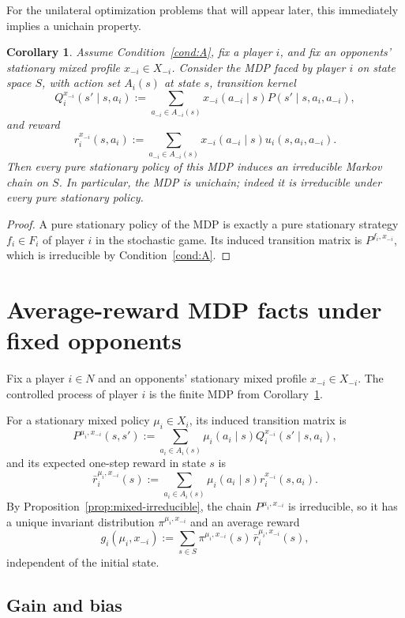 \documentclass[11pt]{article}
\newtheorem{corollary}[theorem]{Corollary}
\theoremstyle{definition}
\newcommand{\1}{\mathbf{1}}
\begin{document}
For the unilateral optimization problems that will appear later, this immediately implies a unichain property.

\begin{corollary}\label{cor:unichain-from-A}
Assume Condition~\ref{cond:A}, fix a player $i$, and fix an opponents' stationary mixed profile $x_{-i}\in X_{-i}$. Consider the MDP faced by player $i$ on state space $S$, with action set $A_i(s)$ at state $s$, transition kernel
\[
Q_i^{x_{-i}}(s'\mid s,a_i):=\sum_{a_{-i}\in A_{-i}(s)}x_{-i}(a_{-i}\mid s)P(s'\mid s,a_i,a_{-i}),
\]
and reward
\[
r_i^{x_{-i}}(s,a_i):=\sum_{a_{-i}\in A_{-i}(s)}x_{-i}(a_{-i}\mid s)u_i(s,a_i,a_{-i}).
\]
Then every pure stationary policy of this MDP induces an irreducible Markov chain on $S$. In particular, the MDP is unichain; indeed it is irreducible under every pure stationary policy.
\end{corollary}

\begin{proof}
A pure stationary policy of the MDP is exactly a pure stationary strategy $f_i\in F_i$ of player $i$ in the stochastic game. Its induced transition matrix is $P^{f_i,x_{-i}}$, which is irreducible by Condition~\ref{cond:A}.
\end{proof}

\section{Average-reward MDP facts under fixed opponents}\label{sec:mdp}

Fix a player $i\in N$ and an opponents' stationary mixed profile $x_{-i}\in X_{-i}$. The controlled process of player $i$ is the finite MDP from Corollary~\ref{cor:unichain-from-A}.

For a stationary mixed policy $\mu_i\in X_i$, its induced transition matrix is
\[
P^{\mu_i,x_{-i}}(s,s'):=\sum_{a_i\in A_i(s)}\mu_i(a_i\mid s)
Q_i^{x_{-i}}(s'\mid s,a_i),
\]
and its expected one-step reward in state $s$ is
\[
\bar r_i^{\mu_i,x_{-i}}(s):=\sum_{a_i\in A_i(s)}\mu_i(a_i\mid s)r_i^{x_{-i}}(s,a_i).
\]
By Proposition~\ref{prop:mixed-irreducible}, the chain $P^{\mu_i,x_{-i}}$ is irreducible, so it has a unique invariant distribution $\pi^{\mu_i,x_{-i}}$ and an average reward
\[
g_i(\mu_i,x_{-i})
:=\sum_{s\in S}\pi^{\mu_i,x_{-i}}(s)\,\bar r_i^{\mu_i,x_{-i}}(s),
\]
independent of the initial state.

\subsection{Gain and bias}
\end{document}

